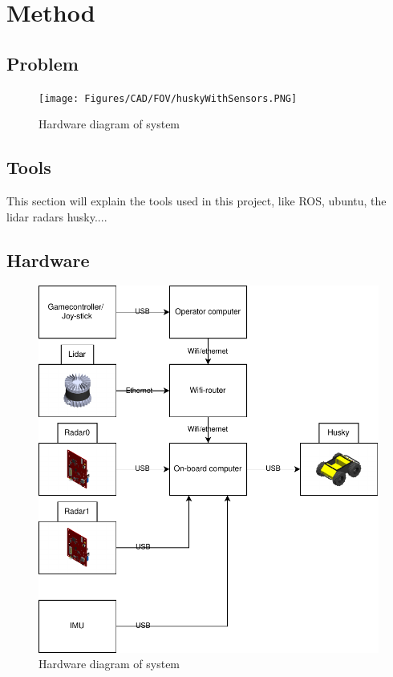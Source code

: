 \chapter{Method}
\section{Problem}

\begin{figure}[H]
    \centering
    \texttt{[image: Figures/CAD/FOV/huskyWithSensors.PNG]}
    \caption{Hardware diagram of system}
    \label{fig:HWdiagram}
\end{figure}

\section{Tools}
This section will explain the tools used in this project, like ROS, ubuntu, the lidar radars husky....

\section{Hardware}

\begin{figure}[H]
    \centering
    \includegraphics[scale=1]{Figures/draw.io/hardwareBlockDiagram.drawio.pdf}
    \caption{Hardware diagram of system}
    \label{fig:HWdiagram}
\end{figure}

